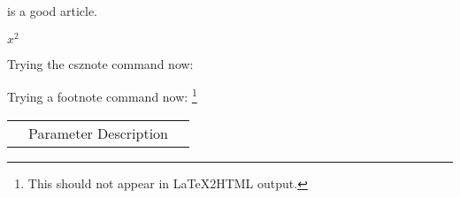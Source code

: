 \documentclass[12pt]{article}
\begin{document}
\pagestyle{plain}
\thispagestyle{empty}
\cite{KJC01} is a good article.

$x^{\!\!2}$

Trying the csznote command now:

Trying a footnote command now:
\footnote{This should not appear in LaTeX2HTML output.}

\begin{table}
\begin{tabular}{ >{$}r<{$} >{\raggedright}p{15.0em}<{} l}
& Parameter Description & 
\end{tabular}
\end{table}



\end{document}
